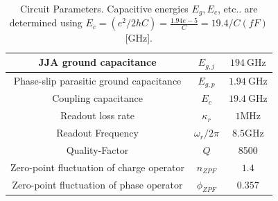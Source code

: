 \documentclass[%
reprint,
superscriptaddress,
 amsmath,amssymb,
 aps,
 prx,
longbibliography,
floatfix,
]{revtex4-2}
\begin{document}
\begin{table}[htb]
\begin{center}
\begin{tabular}{|c |c |c|}
\hline
JJA ground capacitance&$E_{g,j}$&$194 \ \mathrm{GHz}$\\ 
\hline
Phase-slip parasitic ground capacitance&$E_{g,p}$&$1.94 \ \mathrm{GHz}$\\ 
\hline
Coupling capacitance&$E_{c}$ &$19.4 \ \mathrm{GHz}$\\ 
\hline
Readout loss rate&$\kappa_r$&$1$MHz\\
\hline
Readout Frequency &$\omega_r/2\pi$&$8.5$GHz\\
\hline
Quality-Factor& $Q$&8500\\
 \hline
  Zero-point fluctuation of charge operator&$n_{ZPF}$&$1.4$\\
 \hline
Zero-point fluctuation of phase operator &$\phi_{ZPF}$&$0.357$\\
 \hline
\end{tabular}
\end{center}

\caption{Circuit Parameters. Capacitive energies $E_g, E_c$, etc.. are determined using $E_c=(e^2/2hC)=\frac{1.94 e-5}{C}=19.4/C(fF) $[GHz].}
\label{tab:params}
\end{table}
\end{document}
